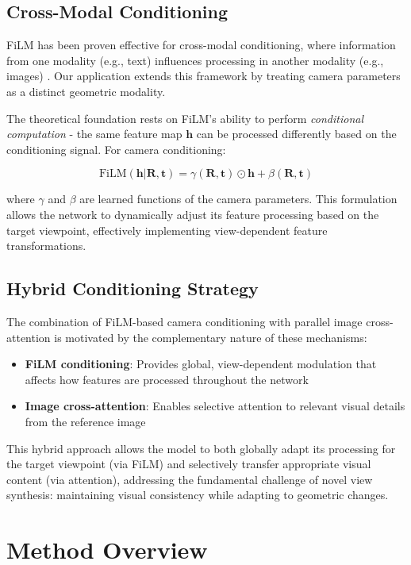 \subsection{Cross-Modal Conditioning}

FiLM has been proven effective for cross-modal conditioning, where information from one modality (e.g., text) influences processing in another modality (e.g., images) \cite{film, filmedunet}. Our application extends this framework by treating camera parameters as a distinct geometric modality.

The theoretical foundation rests on FiLM's ability to perform \textit{conditional computation} - the same feature map $\mathbf{h}$ can be processed differently based on the conditioning signal. For camera conditioning:

\[ \text{FiLM}(\mathbf{h}|\mathbf{R}, \mathbf{t}) = \gamma(\mathbf{R}, \mathbf{t}) \odot \mathbf{h} + \beta(\mathbf{R}, \mathbf{t}) \]

where $\gamma$ and $\beta$ are learned functions of the camera parameters. This formulation allows the network to dynamically adjust its feature processing based on the target viewpoint, effectively implementing view-dependent feature transformations.

\subsection{Hybrid Conditioning Strategy}

The combination of FiLM-based camera conditioning with parallel image cross-attention is motivated by the complementary nature of these mechanisms:

\begin{itemize}
  \item \textbf{FiLM conditioning}: Provides global, view-dependent modulation that affects how features are processed throughout the network
  \item \textbf{Image cross-attention}: Enables selective attention to relevant visual details from the reference image
\end{itemize}

This hybrid approach allows the model to both globally adapt its processing for the target viewpoint (via FiLM) and selectively transfer appropriate visual content (via attention), addressing the fundamental challenge of novel view synthesis: maintaining visual consistency while adapting to geometric changes.

\section{Method Overview}\label{sec:overview}


